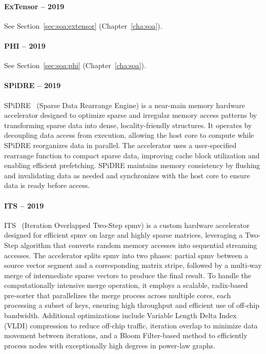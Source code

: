 \paragraph{ExTensor -- 2019}

See Section~\ref{sec:soa:extensor} (Chapter~\ref{cha:soa}).

\paragraph{PHI -- 2019}

See Section~\ref{sec:soa:phi} (Chapter~\ref{cha:soa}).

\paragraph{SPiDRE -- 2019}

SPiDRE~\cite{Barredo2019_SPiDRE} (Sparse Data Rearrange Engine) is a near-main memory hardware accelerator designed to optimize sparse and irregular memory access patterns by transforming sparse data into dense, locality-friendly structures.
It operates by decoupling data access from execution, allowing the host core to compute while SPiDRE reorganizes data in parallel.
The accelerator uses a user-specified rearrange function to compact sparse data, improving cache block utilization and enabling efficient prefetching.
SPiDRE maintains memory consistency by flushing and invalidating data as needed and synchronizes with the host core to ensure data is ready before access.

\paragraph{ITS -- 2019}

ITS~\cite{Sadi2019_ITS} (Iteration Overlapped Two-Step \acrshort{spmv}) is a custom hardware accelerator designed for efficient \acrshort{spmv} on large and highly sparse matrices, leveraging a Two-Step algorithm that converts random memory accesses into sequential streaming accesses.
The accelerator splits \acrshort{spmv} into two phases: partial \acrshort{spmv} between a source vector segment and a corresponding matrix stripe, followed by a multi-way merge of intermediate sparse vectors to produce the final result.
To handle the computationally intensive merge operation, it employs a scalable, radix-based pre-sorter that parallelizes the merge process across multiple cores, each processing a subset of keys, ensuring high throughput and efficient use of off-chip bandwidth.
Additional optimizations include Variable Length Delta Index (VLDI) compression to reduce off-chip traffic, iteration overlap to minimize data movement between iterations, and a Bloom Filter-based method to efficiently process nodes with exceptionally high degrees in power-law graphs.

